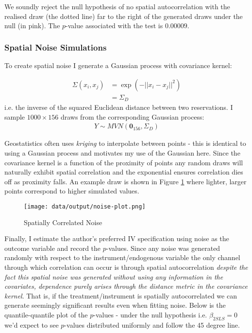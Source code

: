 \documentclass[12pt]{article}
\begin{document}
We soundly reject the null hypothesis of no spatial autocorrelation with the realised draw (the dotted line) far to the right of 
the generated draws under the null (in pink). The $p$-value associated with the test is $0.00009$.


\subsubsection*{Spatial Noise Simulations}

To create spatial noise I generate a Gaussian process with covariance kernel:

\begin{align*}
    \Sigma(x_i, x_j) &= \exp(- || x_i - x_j ||^2) \\
    &= \Sigma_D
\end{align*}
i.e. the inverse of the squared Euclidean distance between two reservations. I sample $1000 \times 156$ draws from the corresponding 
Gaussian process:
\begin{align*}
    Y \sim MVN(\mathbf{0}_{156}, \Sigma_D)
\end{align*}


Geostatistics often uses  \textit{kriging} to interpolate between points - this is identical to using a Gaussian process and motivates 
my use of the Gaussian here. Since the covariance kernel is a function of the proximity of points any random draws will naturally exhibit spatial 
correlation and the exponential ensures correlation dies off as proximity falls. An example draw is shown in Figure \ref{noise} where lighter, larger 
points correspond to higher simulated values.


\begin{figure}[htbp]
    \centering
    \texttt{[image: data/output/noise-plot.png]}
    \caption{Spatially Correlated Noise}
    \label{noise}
\end{figure}

Finally, I estimate the author's preferred IV specification using noise as the outcome variable and record the $p$-values. Since any noise 
was generated randomly with respect to the instrument/endogenous variable the only channel through which correlation can occur is through spatial 
autocorrelation \textit{despite the fact this spatial noise was generated without using any information in the covariates, dependence purely arises through 
the distance metric in the covariance kernel}. That is, if the treatment/instrument is spatially autocorrelated we can generate seemingly significant results 
even when fitting noise. Below is the quantile-quantile plot of the $p$-values - under the null hypothesis i.e. $\beta_{2SLS} = 0$ we'd expect to see $p$-values 
distributed uniformly and follow the 45 degree line.   
\end{document}

